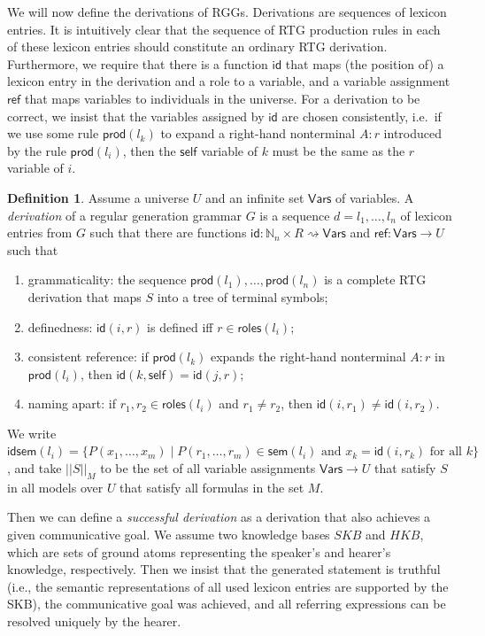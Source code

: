 \documentclass[11pt,a4]{article}
\def\N{\mathbb{N}}
\newcommand{\sem}{\mathsf{sem}}
\newcommand{\self}{\mathsf{self}}
\newcommand{\produ}{\mathsf{prod}}
\newcommand{\roles}{\mathsf{roles}}
\newcommand{\Neq}{{:}}
\newcommand{\refr}{\mathsf{ref}}
\newcommand{\id}{\mathsf{id}}
\newcommand{\idsem}{\mathsf{idsem}}
\newcommand{\Vars}{\mathsf{Vars}}
\theoremstyle{plain}
\theoremstyle{definition}
\newtheorem{definition}[theorem]{Definition}
\begin{document}
We will now define the derivations of RGGs. Derivations are sequences
of lexicon entries. It is intuitively clear that the sequence of RTG
production rules in each of these lexicon entries should constitute an
ordinary RTG derivation. Furthermore, we require that there is a
function $\id$ that maps (the position of) a lexicon entry in the
derivation and a role to a variable, and a variable assignment $\refr$
that maps variables to individuals in the universe. For a derivation
to be correct, we insist that the variables assigned by $\id$ are
chosen consistently, i.e.\ if we use some rule $\produ(l_k)$ to expand
a right-hand nonterminal $A \Neq r$ introduced by the rule
$\produ(l_i)$, then the $\self$ variable of $k$ must be the same as
the $r$ variable of $i$.

\begin{definition} \label{def:rgg-deriv}
  Assume a universe $U$ and an infinite set $\Vars$ of variables. A
  \emph{derivation} of a regular generation grammar $G$ is a sequence
  $d = l_1,\ldots,l_n$ of lexicon entries from $G$ such that there are
  functions $\id:\N_n \times R \rightsquigarrow \Vars$ and
  $\refr:\Vars \rightarrow U$ such that
  \begin{enumerate}
  \item grammaticality: the sequence $\produ(l_1),\ldots,\produ(l_n)$
    is a complete RTG derivation that maps $S$ into a tree of terminal
    symbols;
  \item definedness: $\id(i,r)$ is defined iff $r \in
    \roles(l_i)$;
  \item consistent reference: if $\produ(l_k)$ expands the right-hand
    nonterminal $A:r$ in $\produ(l_i)$, then $\id(k,\self) =
    \id(j,r)$;
  \item naming apart: if $r_1,r_2 \in \roles(l_i)$ and $r_1\neq r_2$,
    then $\id(i,r_1) \neq \id(i,r_2)$.
  \end{enumerate}
\end{definition}

We write $\idsem(l_i) = \{P(x_1,\ldots,x_m) \;|\;
\mbox{$P(r_1,\ldots,r_m) \in \sem(l_i)$ and $x_k = \id(i,r_k)$ for all
  $k$}\}$, and take $||S||_M$ to be the set of all variable
assignments $\Vars \rightarrow U$ that satisfy $S$ in all models over
$U$ that satisfy all formulas in the set $M$.

Then we can define a \emph{successful derivation} as a derivation that
also achieves a given communicative goal. We assume two knowledge
bases $SKB$ and $HKB$, which are sets of ground atoms representing the
speaker's and hearer's knowledge, respectively. Then we insist that
the generated statement is truthful (i.e., the semantic
representations of all used lexicon entries are supported by the SKB),
the communicative goal was achieved, and all referring expressions can
be resolved uniquely by the hearer.
\end{document}
